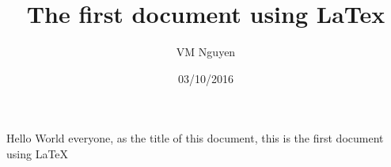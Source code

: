 \documentclass[a4paper,10pt]{article}
\title{The first document using LaTex}
\author{VM Nguyen}
\date{03/10/2016}
\begin{document}
\maketitle
\newpage
Hello World everyone, as the title of this document, this is the first document using LaTeX
\end{document}
